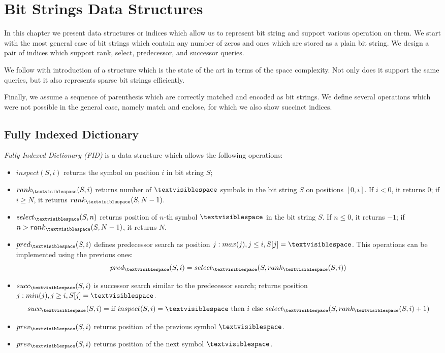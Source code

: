 \chapter{Bit Strings Data Structures}

In this chapter we present data structures or indices which allow us to represent bit string and support various operation on them.
We start with the most general case of bit strings which contain any number of zeros and ones which are stored as a plain bit string.
We design a pair of indices which support rank, select, predecessor, and successor queries.

We follow with introduction of a structure which is the state of the art in terms of the space complexity.
Not only does it support the same queries, but it also represents sparse bit strings efficiently.

Finally, we assume a sequence of parenthesis which are correctly matched and encoded as bit strings.
We define several operations which were not possible in the general case, namely match and enclose, for which we also show succinct indices.

\section{Fully Indexed Dictionary}


\emph{Fully Indexed Dictionary (FID)} is a data structure which allows the following operations:
\begin{itemize}
	\item \emph{$inspect(S, i)$} returns the symbol on position $i$ in bit string $S$;
	\item \emph{$rank_{\ph}(S, i)$} returns number of $\ph$ symbols in the bit string $S$ on positions $[0, i]$.
	If $i < 0$, it returns $0$; if $i \ge N$, it returns $rank_{\ph}(S, N-1)$.
	\item \emph{$select_{\ph}(S, n)$} returns position of $n$-th symbol $\ph$ in the bit string $S$.
	If $n \le 0$, it returns $-1$; if $n > rank_{\ph}(S, N - 1)$, it returns $N$.
	\item \emph{$pred_{\ph}(S, i)$} defines predecessor search as position $j : max(j), j \le i, S[j] = \ph$.
	This operations can be implemented using the previous ones:
	$$ pred_{\ph}(S, i) = select_{\ph}(S, rank_{\ph}(S, i)) $$
	\item \emph{$succ_{\ph}(S, i)$} is successor search similar to the predecessor search; returns position $j: min(j), j \ge i, S[j] = \ph$.
	$$ succ_{\ph}(S, i) = \textrm{if}\ inspect(S, i) = {\ph}\ \textrm{then}\ i \ \textrm{else}\ select_{\ph}(S, rank_{\ph}(S, i) + 1) $$
	\item \emph{$prev_{\ph}(S, i)$} returns position of the previous symbol $\ph$.
	\item \emph{$prev_{\ph}(S, i)$} returns position of the next symbol $\ph$.
\end{itemize}

